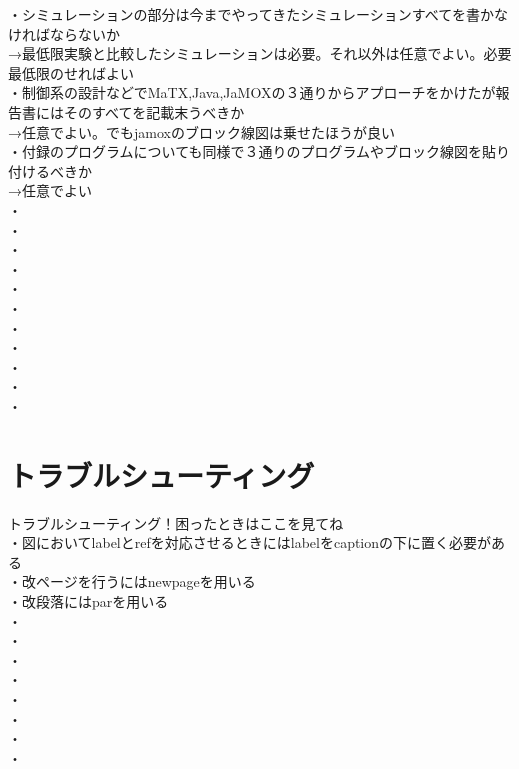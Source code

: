 ・シミュレーションの部分は今までやってきたシミュレーションすべてを書かなければならないか\\
→最低限実験と比較したシミュレーションは必要。それ以外は任意でよい。必要最低限のせればよい\\
・制御系の設計などでMaTX,Java,JaMOXの３通りからアプローチをかけたが報告書にはそのすべてを記載末うべきか\\
→任意でよい。でもjamoxのブロック線図は乗せたほうが良い\\
・付録のプログラムについても同様で３通りのプログラムやブロック線図を貼り付けるべきか\\
→任意でよい\\
・\\
・\\
・\\
・\\
・\\
・\\
・\\
・\\
・\\
・\\
・\\

\section{トラブルシューティング}
トラブルシューティング！困ったときはここを見てね\\
・図においてlabelとrefを対応させるときにはlabelをcaptionの下に置く必要がある\\
・改ページを行うにはnewpageを用いる\\
・改段落にはparを用いる\\
・\\
・\\
・\\
・\\
・\\
・\\
・\\
・\\


